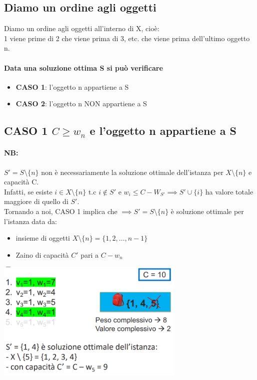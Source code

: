 \subsection{Diamo un ordine agli oggetti}
Diamo un ordine agli oggetti all'interno di X, cioè:\\
1 viene prime di 2 che viene prima di 3, etc. che viene prima dell'ultimo oggetto n.\\
\paragraph*{Data una soluzione ottima S si può verificare}
\begin{itemize}
    \item \textbf{CASO 1}: l'oggetto n appartiene a S
    \item \textbf{CASO 2}: l'oggetto n NON appartiene a S
\end{itemize}
\subsection*{CASO 1 $C \geq w_n$ e l'oggetto n appartiene a S}
\paragraph*{NB:} $S' = S \setminus \{n\}$ non è necessariamente la soluzione ottimale dell'istanza per
$X \setminus \{n\}$ e capacità C.\\
Infatti, se esiste $i \in X \setminus \{n\} \text{ t.c } i \notin S' \text{ e } w_i \leq C - W_{S'} 
\implies S' \cup \{i\}$ ha valore totale maggiore di quello di $S'$.\\
Tornando a noi, CASO 1 implica che $\implies S' = S \setminus \{n\}$ è soluzione ottimale per 
l'istanza data da:
\begin{itemize}
    \item insieme di oggetti $X \setminus \{n\} = \{1,2,\dots,n-1\}$
    \item Zaino di capacità $C'$ pari a $C-w_n$
\end{itemize} 
\begin{center}
    \includegraphics[width=90mm,scale=0.5]{chapters_ulerich/img/knapsack_n_in_S.png}
\end{center}
